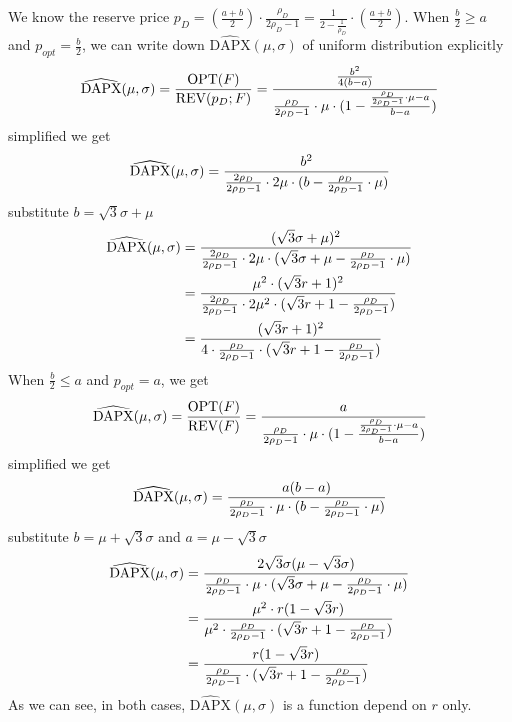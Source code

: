 We know the reserve price $p_D =  (\frac{a+b}{2}) \cdot \frac{\rho_{D}}{2\rho_{D}-1} =\frac{1}{2-\frac{1}{\rho_D}}\cdot (\frac{a+b}{2})$. When $\frac{b}{2} \geqslant a$ and $p_{opt} = \frac{b}{2}$, we can write down $\widehat{\text{DAPX}}(\mu,\sigma)$ of uniform distribution explicitly 
\begin{equation}\notag
\widehat{\text{DAPX}}(\mu,\sigma)= \frac{\text{OPT}(F)}{\text{REV}(p_D;F)} =  \frac{\frac{b^{2}}{4(b-a)}}{\frac{\rho_{D}}{2\rho_{D}-1}\cdot \mu \cdot (1-\frac{\frac{\rho_{D}}{2\rho_{D}-1}\cdot \mu -a}{b-a})}
\end{equation} 
simplified we get 
\begin{equation}\notag
\widehat{\text{DAPX}}(\mu,\sigma)=\frac{b^{2}}{\frac{2\rho_{D}}{2\rho_{D}-1}\cdot 2\mu \cdot(b-\frac{\rho_{D}}{2\rho_{D}-1}\cdot \mu)}
\end{equation} 
substitute $b = \sqrt{3}\sigma + \mu $
\begin{equation}\notag
	\begin{split}	
		\widehat{\text{DAPX}}(\mu,\sigma)&=\frac{( \sqrt{3}\sigma + \mu)^{2}}{\frac{2\rho_{D}}{2\rho_{D}-1}\cdot 2\mu \cdot( \sqrt{3}\sigma + \mu-\frac{\rho_{D}}{2\rho_{D}-1}\cdot \mu)} \\&= \frac{\mu^2 \cdot( \sqrt{3}r +1)^{2}}{\frac{2\rho_{D}}{2\rho_{D}-1}\cdot 2\mu^2 \cdot( \sqrt{3}r+ 1-\frac{\rho_{D}}{2\rho_{D}-1})}\\ 
		&= \frac{ ( \sqrt{3}r +1)^{2}}{4 \cdot \frac{ \rho_{D}}{2\rho_{D}-1}\cdot( \sqrt{3}r+ 1-\frac{\rho_{D}}{2\rho_{D}-1})}	
	\end{split}
\end{equation} 
When  $\frac{b}{2} \leqslant a$ and $p_{opt} = a$, we get 
\begin{equation}\notag
\widehat{\text{DAPX}}(\mu,\sigma) = \frac{\text{OPT}(F)}{\text{REV}(F)} =  \frac{a}{\frac{\rho_{D}}{2\rho_{D}-1}\cdot \mu \cdot (1-\frac{\frac{\rho_{D}}{2\rho_{D}-1}\cdot \mu -a}{b-a})}
\end{equation} 
simplified we get 
\begin{equation}\notag
\widehat{\text{DAPX}}(\mu,\sigma)=\frac{a(b-a)}{\frac{\rho_{D}}{2\rho_{D}-1}\cdot \mu \cdot(b-\frac{\rho_{D}}{2\rho_{D}-1}\cdot \mu)}
\end{equation} 
substitute $b =  \mu +\sqrt{3}\sigma $ and $a  = \mu - \sqrt{3}\sigma$
\begin{equation}\notag
\begin{split}	
	\widehat{\text{DAPX}}(\mu,\sigma) &=\frac{2\sqrt{3}\sigma (\mu - \sqrt{3}\sigma)}{\frac{\rho_{D}}{2\rho_{D}-1}\cdot \mu \cdot( \sqrt{3}\sigma + \mu-\frac{\rho_{D}}{2\rho_{D}-1}\cdot \mu)} \\&= \frac{\mu^2 \cdot r( 1-\sqrt{3}r )}{\mu^2 \cdot \frac{\rho_{D}}{2\rho_{D}-1}\cdot( \sqrt{3}r+ 1-\frac{\rho_{D}}{2\rho_{D}-1})}\\ &= \frac{r( 1-\sqrt{3}r )}{\frac{\rho_{D}}{2\rho_{D}-1}\cdot( \sqrt{3}r+ 1-\frac{\rho_{D}}{2\rho_{D}-1})}
\end{split}
\end{equation} 
As we can see, in both cases, $\widehat{\text{DAPX}}(\mu,\sigma)$ is a function depend on $r$ only. 

